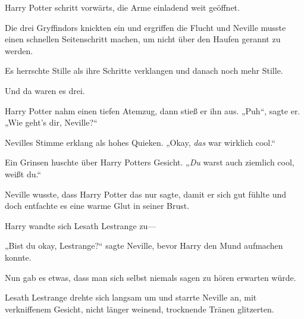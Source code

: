 Harry Potter schritt vorwärts, die Arme einladend weit geöffnet.

Die drei Gryffindors knickten ein und ergriffen die Flucht und Neville musste einen schnellen Seitenschritt machen, um nicht über den Haufen gerannt zu werden.

Es herrschte Stille als ihre Schritte verklangen und danach noch mehr Stille.

Und da waren es drei.

Harry Potter nahm einen tiefen Atemzug, dann stieß er ihn aus. „Puh“, sagte er. „Wie geht’s dir, Neville?“

Nevilles Stimme erklang als hohes Quieken. „Okay, \emph{das} war wirklich cool.“

Ein Grinsen huschte über Harry Potters Gesicht. „\emph{Du} warst auch ziemlich cool, weißt du.“

Neville wusste, dass Harry Potter das nur sagte, damit er sich gut fühlte und doch entfachte es eine warme Glut in seiner Brust.

Harry wandte sich Lesath Lestrange zu—

„Bist du okay, Lestrange?“ sagte Neville, bevor Harry den Mund aufmachen konnte.

Nun gab es etwas, dass man sich selbst niemals sagen zu hören erwarten würde.

Lesath Lestrange drehte sich langsam um und starrte Neville an, mit verkniffenem Gesicht, nicht länger weinend, trocknende Tränen glitzerten.

